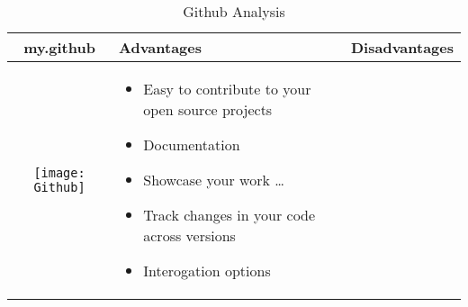 \documentclass{article}
\begin{document}
	
\begin{table}[h!]
	\centering
	\begin{tabular}{ | c | m{5cm} | m{5cm} | }
		\hline
		my.github & Advantages & Disadvantages \\ 
		\hline
		\begin{minipage}{.4\textwidth}
			\texttt{[image: Github]}
		\end{minipage}
		&
		  \begin{itemize}
		  	\item Easy to contribute to your open source projects
		  	\item Documentation
		  	\item Showcase your work \ldots
		  	\item Track changes in your code across versions
		  	\item Interogation options
		\end{itemize}
		\\ \hline
		\end{tabular}
		\caption{Github Analysis}\label{tbl:mygithub}
	\end{table}
\end{document}

